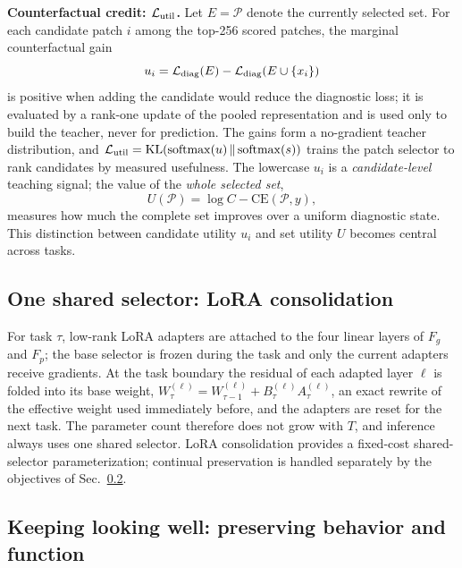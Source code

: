 \documentclass{article}
\def\L{{\cal L}}
\newcommand{\Fg}{F_g}
\newcommand{\Fp}{F_p}
\newcommand{\Psel}{\mathcal{P}}
\begin{document}
\textbf{Counterfactual credit: $\L_{\mathrm{util}}$.}
Let $E=\Psel$ denote the currently selected set. For each candidate patch $i$ among the top-256 scored patches, the marginal counterfactual gain
\begin{equation}
u_i
=
\L_{\mathrm{diag}}(E)
-
\L_{\mathrm{diag}}(E\cup\{x_i\})
\label{eq:ui}
\end{equation}
is positive when adding the candidate would reduce the diagnostic loss; it is evaluated by a rank-one update of the pooled representation and is used only to build the teacher, never for prediction. The gains form a no-gradient teacher distribution, and $\L_{\mathrm{util}}=\mathrm{KL}(\mathrm{softmax}(u)\,\Vert\,\mathrm{softmax}(s))$ trains the patch selector to rank candidates by measured usefulness. The lowercase $u_i$ is a \emph{candidate-level} teaching signal; the value of the \emph{whole selected set},
\begin{equation}
U(\Psel)
=
\log C-\mathrm{CE}(\Psel,y),
\label{eq:bigU}
\end{equation}
measures how much the complete set improves over a uniform diagnostic state. This distinction between candidate utility $u_i$ and set utility $U$ becomes central across tasks.

\subsection{One shared selector: LoRA consolidation}
\label{ssec:lora}

For task $\tau$, low-rank LoRA adapters are attached to the four linear layers of $\Fg$ and $\Fp$; the base selector is frozen during the task and only the current adapters receive gradients. At the task boundary the residual of each adapted layer $\ell$ is folded into its base weight, $W^{(\ell)}_{\tau}=W^{(\ell)}_{\tau-1}+B^{(\ell)}_\tau A^{(\ell)}_\tau$, an exact rewrite of the effective weight used immediately before, and the adapters are reset for the next task. The parameter count therefore does not grow with $T$, and inference always uses one shared selector. LoRA consolidation provides a fixed-cost shared-selector parameterization; continual preservation is handled separately by the objectives of Sec.~\ref{ssec:cl}.

\subsection{Keeping looking well: preserving behavior and function}
\label{ssec:cl}
\end{document}
